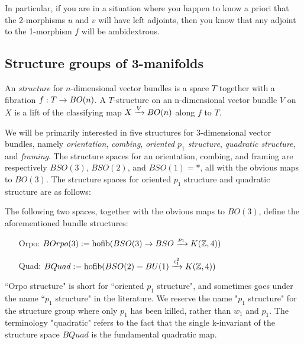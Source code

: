 \documentclass{amsart}
\begin{document}
In particular, if you are in a situation where you happen to know a priori that the 2-morphisms $u$ and $v$ will have left adjoints, then you know that any adjoint to the 1-morphism $f$ will be ambidextrous.  %

\subsection{Structure groups of 3-manifolds} \label{sec-lft-struc}

\begin{definition}
An \emph{structure} for $n$-dimensional vector bundles is a space $T$ together with a fibration $f: T \rightarrow BO(n)$.  A $T$-structure on an n-dimensional vector bundle $V$ on $X$ is a lift of the classifying map $X \xrightarrow{V} BO(n)$ along $f$ to $T$.
\end{definition}

We will be primarily interested in five structures for 3-dimensional vector bundles, namely \emph{orientation}, \emph{combing}, \emph{oriented $p_1$ structure}, \emph{quadratic structure}, and \emph{framing}.  The structure spaces for an orientation, combing, and framing are respectively $BSO(3)$, $BSO(2)$, and $BSO(1) = *$, all with the obvious maps to $BO(3)$.  The structure spaces for oriented $p_1$ structure and quadratic structure are as follows:
\begin{definition}
The following two spaces, together with the obvious maps to $BO(3)$, define the aforementioned bundle structures:
\begin{itemize}
\item[Orpo:] $BOrpo(3) := \operatorname{hofib}(BSO(3) \rightarrow BSO \xrightarrow{p_1} K(\mathbb Z,4))$
\item[Quad:] $BQuad := \operatorname{hofib}(BSO(2) = BU(1) \xrightarrow{c_1^2} K(\mathbb Z,4))$
\end{itemize}
\end{definition}

\begin{remark}
``Orpo structure" is short for ``oriented $p_1$ structure", and sometimes goes under the name ``$p_1$ structure" in the literature.  We reserve the name "$p_1$ structure" for the structure group where only $p_1$ has been killed, rather than $w_1$ and $p_1$.  The terminology "quadratic" refers to the fact that the single k-invariant of the structure space $BQuad$ is the fundamental quadratic map.
\end{remark}
\end{document}
